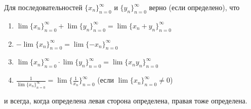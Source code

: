 \documentclass[12pt,a4paper]{article}
\begin{document}
    \begin{statement}
        Для последовательностей $\{x_n\}_{n=0}^\infty$ и $\{y_n\}_{n=0}^\infty$ верно (если определено), что
        \begin{enumerate}
            \item $\lim \{x_n\}_{n=0}^\infty + \lim \{y_n\}_{n=0}^\infty = \lim \{x_n + y_n\}_{n=0}^\infty$
            \item $-\lim \{x_n\}_{n=0}^\infty = \lim \{-x_n\}_{n=0}^\infty$
            \item $\lim \{x_n\}_{n=0}^\infty \cdot \lim \{y_n\}_{n=0}^\infty = \lim \{x_n y_n\}_{n=0}^\infty$
            \item $\frac{1}{\lim \{x_n\}_{n=0}^\infty} = \lim \{\frac{1}{x_n}\}_{n=0}^\infty$ (если $\lim \{x_n\}_{n=0}^\infty \neq 0$)
        \end{enumerate}
        и всегда, когда определена левая сторона определена, правая тоже определена.
    \end{statement}
\end{document}
